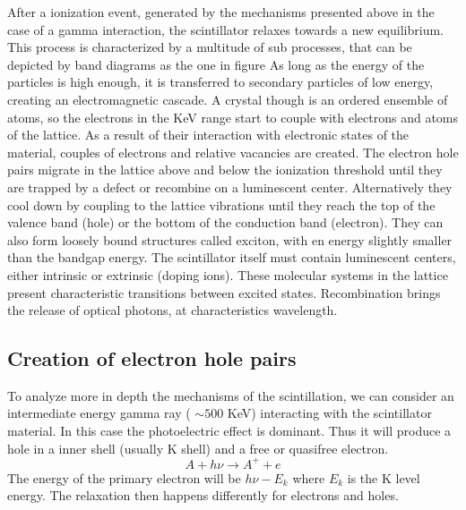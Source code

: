 After a ionization event, generated by the mechanisms presented above in the case of a gamma interaction, the scintillator relaxes towards a new equilibrium. This process is characterized by a multitude of sub processes, that can be depicted by band diagrams as the one in figure %
As long as the energy of the particles is high enough, it is transferred to secondary particles of low energy, creating an electromagnetic cascade.
A crystal though is an ordered ensemble of atoms, so the electrons in the KeV range start to couple with electrons and atoms of the lattice. As a result of their interaction with electronic states of the material, couples of electrons and relative vacancies are created. The electron hole pairs migrate in the lattice above and below the ionization threshold until they are trapped by a defect or recombine on a luminescent center. Alternatively they cool down by coupling to the lattice vibrations until they reach the top of the valence band (hole) or the bottom of the conduction band (electron). They can also form loosely bound structures called exciton, with en energy slightly smaller than the bandgap energy.
The scintillator itself must contain luminescent centers, either intrinsic or extrinsic (doping ions). These molecular systems in the lattice present characteristic transitions between excited states.
Recombination brings the release of optical photons, at characteristics wavelength.
%
%

\subsection{Creation of electron hole pairs}

To analyze more in depth the mechanisms of the scintillation, we can consider an intermediate energy gamma ray ( $\sim 500$ KeV) interacting with the scintillator material. In this case the photoelectric effect is dominant. Thus it will produce a hole in a inner shell (usually K shell) and a free or quasifree electron.
\begin{equation}
A + h\nu \rightarrow A^{+} + e
\end{equation}
The energy of the primary electron will be $h\nu - E_{k}$ where $E_{k}$ is the K level energy. The relaxation then happens differently for electrons and holes. 

